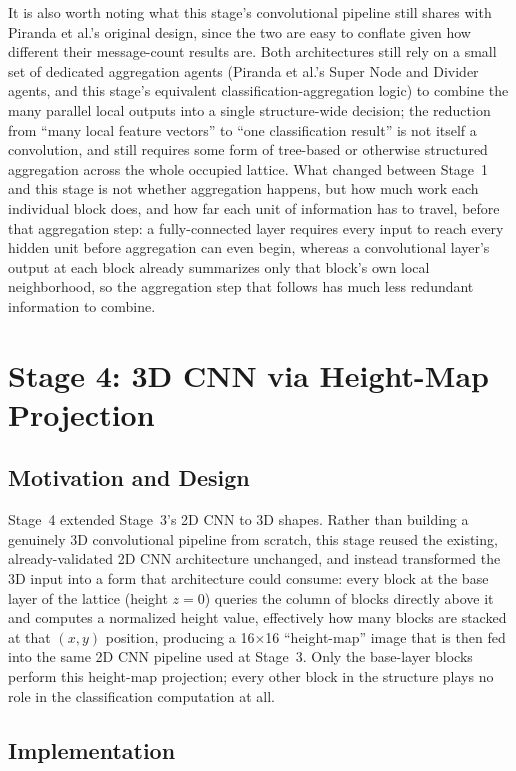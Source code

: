\documentclass[12pt,a4paper]{report}
\begin{document}
It is also worth noting what this stage's convolutional pipeline still shares with Piranda et al.'s original design, since the two are easy to conflate given how different their message-count results are. Both architectures still rely on a small set of dedicated aggregation agents (Piranda et al.'s Super Node and Divider agents, and this stage's equivalent classification-aggregation logic) to combine the many parallel local outputs into a single structure-wide decision; the reduction from ``many local feature vectors'' to ``one classification result'' is not itself a convolution, and still requires some form of tree-based or otherwise structured aggregation across the whole occupied lattice. What changed between Stage~1 and this stage is not whether aggregation happens, but how much work each individual block does, and how far each unit of information has to travel, before that aggregation step: a fully-connected layer requires every input to reach every hidden unit before aggregation can even begin, whereas a convolutional layer's output at each block already summarizes only that block's own local neighborhood, so the aggregation step that follows has much less redundant information to combine.

\section{Stage 4: 3D CNN via Height-Map Projection}
\label{sec:stage4}

\subsection*{Motivation and Design}

Stage~4 extended Stage~3's 2D CNN to 3D shapes. Rather than building a genuinely 3D convolutional pipeline from scratch, this stage reused the existing, already-validated 2D CNN architecture unchanged, and instead transformed the 3D input into a form that architecture could consume: every block at the base layer of the lattice (height $z=0$) queries the column of blocks directly above it and computes a normalized height value, effectively how many blocks are stacked at that $(x,y)$ position, producing a 16$\times$16 ``height-map'' image that is then fed into the same 2D CNN pipeline used at Stage~3. Only the base-layer blocks perform this height-map projection; every other block in the structure plays no role in the classification computation at all.

\subsection*{Implementation}
\end{document}
